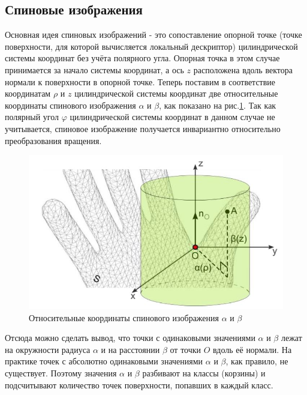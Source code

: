 \documentclass[14pt]{article}
\numberwithin{figure}{section}
\numberwithin{equation}{section}
\begin{document}
\subsection{Спиновые изображения}

Основная идея спиновых изображений - это сопоставление опорной точке (точке поверхности, для которой вычисляется локальный дескриптор) цилиндрической системы координат без учёта полярного угла. Опорная точка в этом случае принимается за начало системы координат, а ось $z$ расположена вдоль вектора нормали к поверхности в опорной точке. Теперь поставим в соответствие координатам $\rho$ и $z$ цилиндрической системы координат две относительные координаты спинового изображения $\alpha$ и $\beta$, как показано на рис.\ref{ris:2}. Так как полярный угол $\varphi$ цилиндрической системы координат в данном случае не учитывается, спиновое изображение получается инвариантно относительно преобразования вращения.

\begin{figure}[h]
	\begin{center}
		\includegraphics[scale=0.9]{2.JPG}
		\caption{Относительные координаты спинового изображения $\alpha$ и $\beta$}
		\label{ris:2}
	\end{center}
\end{figure}

Отсюда можно сделать вывод, что точки с одинаковыми значениями $\alpha$ и $\beta$ лежат на окружности радиуса $\alpha$ и на расстоянии $\beta$ от точки $O$ вдоль её нормали. На практике точек с абсолютно одинаковыми значениями $\alpha$ и $\beta$, как правило, не существует. Поэтому значения $\alpha$ и $\beta$ разбивают на классы (корзины) и подсчитывают количество точек поверхности, попавших в каждый класс.
\end{document}
